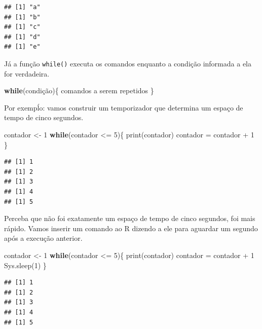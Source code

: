 \documentclass[
]{book}
\newenvironment{Shaded}{\begin{snugshade}}{\end{snugshade}}
\newcommand{\ControlFlowTok}[1]{\textcolor[rgb]{0.13,0.29,0.53}{\textbf{#1}}}
\newcommand{\DecValTok}[1]{\textcolor[rgb]{0.00,0.00,0.81}{#1}}
\newcommand{\FunctionTok}[1]{\textcolor[rgb]{0.00,0.00,0.00}{#1}}
\newcommand{\NormalTok}[1]{#1}
\newcommand{\OtherTok}[1]{\textcolor[rgb]{0.56,0.35,0.01}{#1}}
\newcommand{\SpecialCharTok}[1]{\textcolor[rgb]{0.00,0.00,0.00}{#1}}
\begin{document}
\begin{verbatim}
## [1] "a"
## [1] "b"
## [1] "c"
## [1] "d"
## [1] "e"
\end{verbatim}

Já a função \texttt{while()} executa os comandos enquanto a condição informada a ela for verdadeira.

\begin{Shaded}
\begin{Highlighting}[]
\ControlFlowTok{while}\NormalTok{(condição)\{}
\NormalTok{  comandos a serem repetidos}
\NormalTok{\}}
\end{Highlighting}
\end{Shaded}

Por exempĺo: vamos construir um temporizador que determina um espaço de tempo de cinco segundos.

\begin{Shaded}
\begin{Highlighting}[]
\NormalTok{contador }\OtherTok{\textless{}{-}} \DecValTok{1}
\ControlFlowTok{while}\NormalTok{(contador }\SpecialCharTok{\textless{}=} \DecValTok{5}\NormalTok{)\{}
  \FunctionTok{print}\NormalTok{(contador)}
\NormalTok{  contador }\OtherTok{=}\NormalTok{ contador }\SpecialCharTok{+} \DecValTok{1}
\NormalTok{\}}
\end{Highlighting}
\end{Shaded}

\begin{verbatim}
## [1] 1
## [1] 2
## [1] 3
## [1] 4
## [1] 5
\end{verbatim}

Perceba que não foi exatamente um espaço de tempo de cinco segundos, foi mais rápido. Vamos inserir um comando ao R dizendo a ele para aguardar um segundo após a execução anterior.

\begin{Shaded}
\begin{Highlighting}[]
\NormalTok{contador }\OtherTok{\textless{}{-}} \DecValTok{1}
\ControlFlowTok{while}\NormalTok{(contador }\SpecialCharTok{\textless{}=} \DecValTok{5}\NormalTok{)\{}
  \FunctionTok{print}\NormalTok{(contador)}
\NormalTok{  contador }\OtherTok{=}\NormalTok{ contador }\SpecialCharTok{+} \DecValTok{1}
  \FunctionTok{Sys.sleep}\NormalTok{(}\DecValTok{1}\NormalTok{)}
\NormalTok{\}}
\end{Highlighting}
\end{Shaded}

\begin{verbatim}
## [1] 1
## [1] 2
## [1] 3
## [1] 4
## [1] 5
\end{verbatim}
\end{document}

